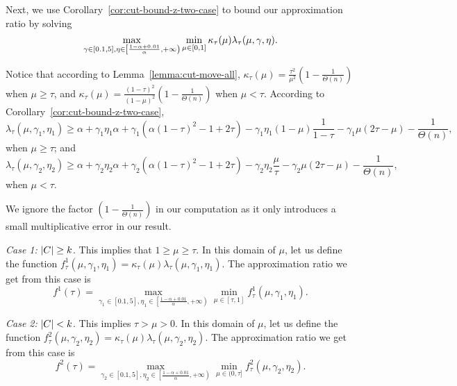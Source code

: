 Next, we use Corollary~\ref{cor:cut-bound-z-two-case} to bound our approximation
ratio by solving
\begin{equation}
	\max_{\gamma \in [0.1, 5], \eta \in \left[\frac{1-\alpha + 0.01}{\alpha}, +\infty\right)} \min_{\mu \in [0 ,1]} \kappa_{\tau}(\mu) \lambda_{\tau}(\mu, \gamma, \eta).
\end{equation}

Notice that according to Lemma~\ref{lemma:cut-move-all}, $\kappa_{\tau}(\mu) = \frac{\tau^2}{\mu^2} (1 - \frac{1}{\Theta(n)})$ when $\mu \geq \tau$, and $\kappa_{\tau}(\mu) = \frac{(1- \tau)^2}{(1-\mu)^2}(1 - \frac{1}{\Theta(n)})$ when $\mu < \tau$. 
According to Corollary~\ref{cor:cut-bound-z-two-case}, 
\begin{equation}
\lambda_{\tau}(\mu, \gamma_1, \eta_1) \geq \alpha + \gamma_1 \eta_1 \alpha + \gamma_1 (\alpha (1 - \tau)^2 - 1 + 2\tau) - \gamma_1 \eta_1 (1-\mu)\frac{1}{1-\tau} - \gamma_1 \mu (2\tau - \mu) - \frac{1}{\Theta(n)},
\end{equation}
when $\mu \geq \tau$;
and 
\begin{equation}
\lambda_{\tau}(\mu, \gamma_2, \eta_2) \geq \alpha + \gamma_2 \eta_2 \alpha + \gamma_2 (\alpha (1 - \tau)^2 - 1 + 2\tau) - \gamma_2 \eta_2 \frac{\mu}{\tau} - \gamma_2 \mu (2\tau - \mu) - \frac{1}{\Theta(n)},
\end{equation}
when $\mu < \tau$. 

We ignore the factor $(1 - \frac{1}{\Theta(n)})$ in our computation as it only introduces a small multiplicative error in our result.

\emph{Case 1:} $\lvert C\rvert \geq k$. This implies that $1 \geq \mu \geq
\tau$. In this domain of $\mu$, let us define the function $f^1_{\tau}(\mu, \gamma_1, \eta_1) = \kappa_{\tau}(\mu)\lambda_{\tau}(\mu, \gamma_1, \eta_1)$. 
The approximation ratio we get from this case is 
$$f^1(\tau) = \max_{\gamma_1 \in [0.1, 5], \eta_1 \in \left[\frac{1-\alpha+0.01}{\alpha}, +\infty\right)} \min_{\mu \in [\tau, 1]} f^1_{\tau}(\mu, \gamma_1, \eta_1).$$ 


\emph{Case 2:} $\lvert C\rvert <k$. This implies $\tau > \mu > 0$. In this
domain of $\mu$, let us define the function $f^2_{\tau}(\mu, \gamma_2, \eta_2) = \kappa_{\tau}(\mu)\lambda_{\tau}(\mu, \gamma_2, \eta_2)$. 
The approximation ratio we get from this case is 
$$f^2(\tau) =\max_{\gamma_2 \in [0.1, 5], \eta_2 \in \left[\frac{1-\alpha+0.01}{\alpha}, +\infty\right)} \min_{\mu \in (0, \tau]} f^2_{\tau}(\mu, \gamma_2, \eta_2).$$ 

